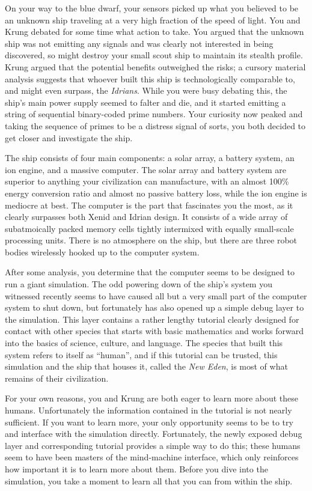 \documentclass[char]{guildcamp1}
\begin{document}
On your way to the blue dwarf, your sensors picked up what you believed to be an unknown ship traveling at a very high fraction of the speed of light. You and Krung debated for some time what action to take. You argued that the unknown ship was not emitting any signals and was clearly not interested in being discovered, so might destroy your small scout ship to maintain its stealth profile. Krung argued that the potential benefits outweighed the risks; a cursory material analysis suggests that whoever built this ship is technologically comparable to, and might even surpass, the \emph{Idrians}. While you were busy debating this, the ship's main power supply seemed to falter and die, and it started emitting a string of sequential binary-coded prime numbers. Your curiosity now peaked and taking the sequence of primes to be a distress signal of sorts, you both decided to get closer and investigate the ship.

The ship consists of four main components: a solar array, a battery system, an ion engine, and a massive computer. The solar array and battery system are superior to anything your civilization can manufacture, with an almost 100\% energy conversion ratio and almost no passive battery loss, while the ion engine is mediocre at best. The computer is the part that fascinates you the most, as it clearly surpasses both Xenid and Idrian design. It consists of a wide array of subatmoically packed memory cells tightly intermixed with equally small-scale processing units. There is no atmosphere on the ship, but there are three robot bodies wirelessly hooked up to the computer system.

After some analysis, you determine that the computer seems to be designed to run a giant simulation. The odd powering down of the ship's system you witnessed recently seems to have caused all but a very small part of the computer system to shut down, but fortunately has also opened up a simple debug layer to the simulation. This layer contains a rather lengthy tutorial clearly designed for contact with other species that starts with basic mathematics and works forward into the basics of science, culture, and language. The species that built this system refers to itself as ``human'', and if this tutorial can be trusted, this simulation and the ship that houses it, called the \emph{New Eden}, is most of what remains of their civilization.

For your own reasons, you and Krung are both eager to learn more about these humans. Unfortunately the information contained in the tutorial is not nearly sufficient. If you want to learn more, your only opportunity seems to be to try and interface with the simulation directly. Fortunately, the newly exposed debug layer and corresponding tutorial provides a simple way to do this; these humans seem to have been masters of the mind-machine interface, which only reinforces how important it is to learn more about them. Before you dive into the simulation, you take a moment to learn all that you can from within the ship.
\end{document}
